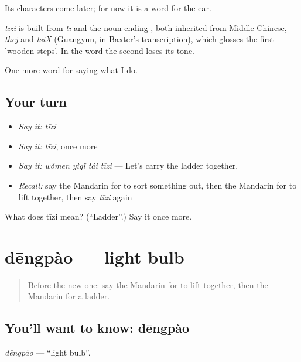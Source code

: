 Its characters come later; for now it is a word for the ear.

\begin{cousinweb}
\emph{tīzi} is built from \emph{tī} and the noun ending , both inherited from Middle Chinese, \emph{thej} and \emph{tsiX} (Guangyun, in Baxter's transcription), which glosses the first 'wooden steps'. In the word the second loses its tone.
\end{cousinweb}

\begin{grammarlens}[title={What you've built}]
One more word for saying what I do.
\end{grammarlens}

\subsection*{Your turn}
\begin{itemize}
\raggedright
  \item \emph{Say it:} \emph{tīzi}
  \item \emph{Say it:} \emph{tīzi}, once more
  \item \emph{Say it:} \emph{wǒmen yìqǐ tái tīzi} — Let's carry the ladder together.
  \item \emph{Recall:} say the Mandarin for to sort something out, then the Mandarin for to lift together, then say \emph{tīzi} again
\end{itemize}

\begin{tcolorbox}[breakable,colback=teal!4,colframe=teal!35!black,title={Before you move on}]
What does tīzi mean? (\textquotedblleft{}Ladder\textquotedblright{}.) Say it once more.
\end{tcolorbox}
\section[dēngpào]{dēngpào — light bulb}

\label{lesson:ZH-C174-dengpao}



\begin{quote}
Before the new one: say the Mandarin for to lift together, then the Mandarin for a ladder.
\end{quote}

\subsection*{You'll want to know: dēngpào}
\emph{dēngpào} — \textquotedblleft{}light bulb\textquotedblright{}.

